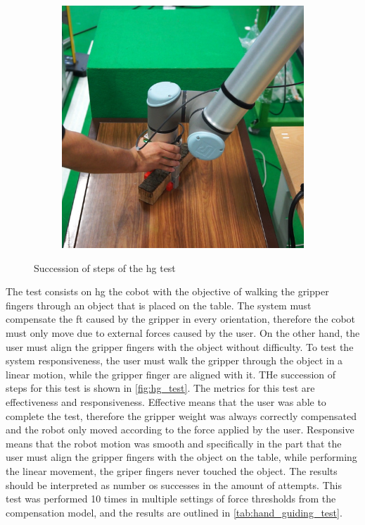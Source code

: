 \begin{figure}[h]
\begin{subfigure}{.2\linewidth}
    \end{subfigure}%
    \begin{subfigure}{.2\linewidth}
        \centering
        \includegraphics[width=.95\linewidth]{figs/chp6/hg_test_4.jpg}
    \end{subfigure}
    \caption{Succession of steps of the \ac{hg} test}
    \label{fig:hg_test}
\end{figure}

\par The test consists on  \ac{hg} the cobot with the objective of walking the gripper fingers through an object that is placed on the table. The system must compensate the \ac{ft} caused by the gripper in every orientation, therefore the cobot must only move due to external forces caused by the user. On the other hand, the user must align the gripper fingers with the object without difficulty. To test the system responsiveness, the user must walk the gripper through the object in a linear motion, while the gripper finger are aligned with it. THe succession of steps for this test is shown in \autoref{fig:hg_test}. 
The metrics for this test are effectiveness and responsiveness. Effective means that the user was able to complete the test, therefore the gripper weight was always correctly compensated and the robot only moved according to the force applied by the user. Responsive means that the robot motion was smooth and specifically in the part that the user must align the gripper fingers with the object on the table, while performing the linear movement, the griper fingers never touched the object. The results should be interpreted as number os successes in the amount of attempts. This test was performed 10 times in multiple settings of force thresholds from the compensation model, and the results are outlined in \autoref{tab:hand_guiding_test}. 


